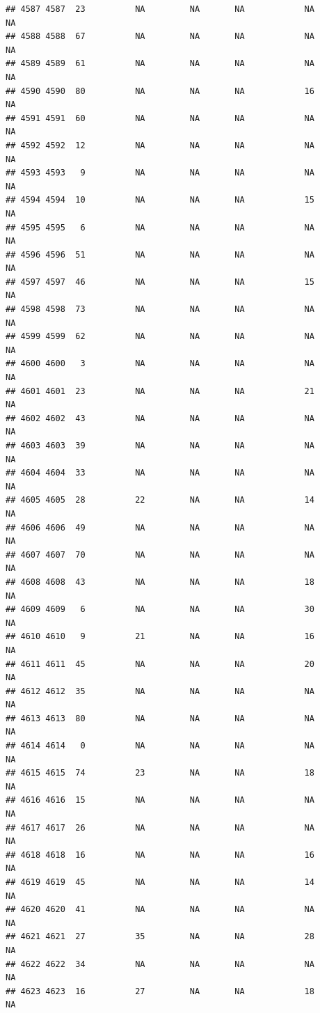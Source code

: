 \documentclass[man]{apa6}
\begin{document}
\begin{verbatim}
## 4587 4587  23          NA         NA       NA            NA       NA
## 4588 4588  67          NA         NA       NA            NA       NA
## 4589 4589  61          NA         NA       NA            NA       NA
## 4590 4590  80          NA         NA       NA            16       NA
## 4591 4591  60          NA         NA       NA            NA       NA
## 4592 4592  12          NA         NA       NA            NA       NA
## 4593 4593   9          NA         NA       NA            NA       NA
## 4594 4594  10          NA         NA       NA            15       NA
## 4595 4595   6          NA         NA       NA            NA       NA
## 4596 4596  51          NA         NA       NA            NA       NA
## 4597 4597  46          NA         NA       NA            15       NA
## 4598 4598  73          NA         NA       NA            NA       NA
## 4599 4599  62          NA         NA       NA            NA       NA
## 4600 4600   3          NA         NA       NA            NA       NA
## 4601 4601  23          NA         NA       NA            21       NA
## 4602 4602  43          NA         NA       NA            NA       NA
## 4603 4603  39          NA         NA       NA            NA       NA
## 4604 4604  33          NA         NA       NA            NA       NA
## 4605 4605  28          22         NA       NA            14       NA
## 4606 4606  49          NA         NA       NA            NA       NA
## 4607 4607  70          NA         NA       NA            NA       NA
## 4608 4608  43          NA         NA       NA            18       NA
## 4609 4609   6          NA         NA       NA            30       NA
## 4610 4610   9          21         NA       NA            16       NA
## 4611 4611  45          NA         NA       NA            20       NA
## 4612 4612  35          NA         NA       NA            NA       NA
## 4613 4613  80          NA         NA       NA            NA       NA
## 4614 4614   0          NA         NA       NA            NA       NA
## 4615 4615  74          23         NA       NA            18       NA
## 4616 4616  15          NA         NA       NA            NA       NA
## 4617 4617  26          NA         NA       NA            NA       NA
## 4618 4618  16          NA         NA       NA            16       NA
## 4619 4619  45          NA         NA       NA            14       NA
## 4620 4620  41          NA         NA       NA            NA       NA
## 4621 4621  27          35         NA       NA            28       NA
## 4622 4622  34          NA         NA       NA            NA       NA
## 4623 4623  16          27         NA       NA            18       NA

\end{verbatim}
\end{document}
